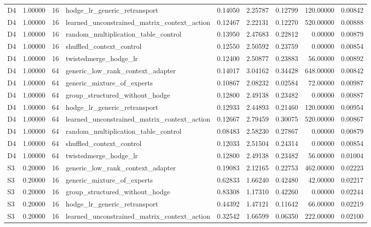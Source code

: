 \begin{tabular}{lrrlrrrrr}
D4 & 1.00000 & 16 & hodge_lr_generic_retransport & 0.14050 & 2.25787 & 0.12799 & 120.00000 & 0.00842 \\
D4 & 1.00000 & 16 & learned_unconstrained_matrix_context_action & 0.12467 & 2.22131 & 0.12270 & 520.00000 & 0.00888 \\
D4 & 1.00000 & 16 & random_multiplication_table_control & 0.13950 & 2.47683 & 0.22812 & 0.00000 & 0.00879 \\
D4 & 1.00000 & 16 & shuffled_context_control & 0.12550 & 2.50592 & 0.23759 & 0.00000 & 0.00854 \\
D4 & 1.00000 & 16 & twistedmerge_hodge_lr & 0.12400 & 2.50877 & 0.23883 & 56.00000 & 0.00892 \\
D4 & 1.00000 & 64 & generic_low_rank_context_adapter & 0.14017 & 3.04162 & 0.34428 & 648.00000 & 0.00842 \\
D4 & 1.00000 & 64 & generic_mixture_of_experts & 0.10867 & 2.08232 & 0.02584 & 72.00000 & 0.00987 \\
D4 & 1.00000 & 64 & group_structured_without_hodge & 0.12800 & 2.49138 & 0.23482 & 0.00000 & 0.00887 \\
D4 & 1.00000 & 64 & hodge_lr_generic_retransport & 0.12933 & 2.44893 & 0.21460 & 120.00000 & 0.00954 \\
D4 & 1.00000 & 64 & learned_unconstrained_matrix_context_action & 0.12667 & 2.79459 & 0.30075 & 520.00000 & 0.00867 \\
D4 & 1.00000 & 64 & random_multiplication_table_control & 0.08483 & 2.58230 & 0.27867 & 0.00000 & 0.00879 \\
D4 & 1.00000 & 64 & shuffled_context_control & 0.12033 & 2.51504 & 0.24314 & 0.00000 & 0.00854 \\
D4 & 1.00000 & 64 & twistedmerge_hodge_lr & 0.12800 & 2.49138 & 0.23482 & 56.00000 & 0.01004 \\
S3 & 0.20000 & 16 & generic_low_rank_context_adapter & 0.19083 & 2.12165 & 0.22753 & 462.00000 & 0.02223 \\
S3 & 0.20000 & 16 & generic_mixture_of_experts & 0.62833 & 1.66240 & 0.42480 & 42.00000 & 0.02217 \\
S3 & 0.20000 & 16 & group_structured_without_hodge & 0.83308 & 1.17310 & 0.42260 & 0.00000 & 0.02244 \\
S3 & 0.20000 & 16 & hodge_lr_generic_retransport & 0.44392 & 1.47121 & 0.11642 & 66.00000 & 0.02219 \\
S3 & 0.20000 & 16 & learned_unconstrained_matrix_context_action & 0.32542 & 1.66599 & 0.06350 & 222.00000 & 0.02100 \\

\end{tabular}
